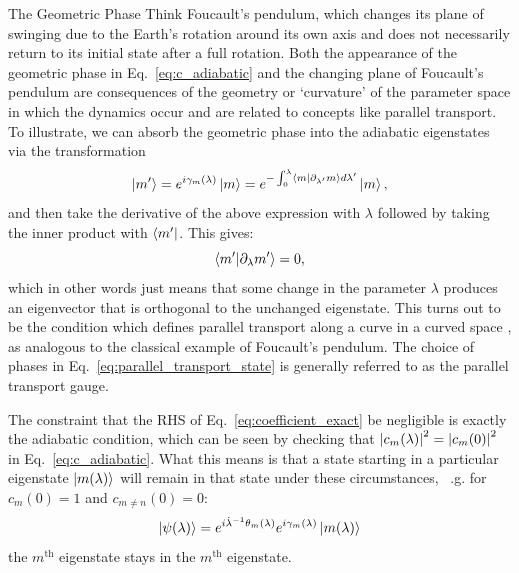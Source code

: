     \begin{mycolorbox}[geometricphase]{{The Geometric Phase}}
        Think Foucault's pendulum, which changes its plane of swinging due to the Earth's rotation around its own axis and does not necessarily return to its initial state after a full rotation. Both the appearance of the geometric phase in Eq.~\eqref{eq:c_adiabatic} and the changing plane of Foucault's pendulum are consequences of the geometry or `curvature' of the parameter space in which the dynamics occur and are related to concepts like parallel transport. To illustrate, we can absorb the geometric phase into the adiabatic eigenstates via the transformation
    \begin{equation}\label{eq:parallel_transport_state}
        \ket{m'} = e^{i \gamma_m(\lambda)}\ket{m} = e^{- \int_0^{\lambda} \braket{m}{\partial_{\lambda'} m} d \lambda'}\ket{m},
    \end{equation}
    and then take the derivative of the above expression with $\lambda$ followed by taking the inner product with $\bra{m'}$. This gives:
    \begin{equation}\label{eq:geometric_phase_cancellation}
        \braket{m'}{\partial_{\lambda} m'} = 0,
    \end{equation}
    which in other words just means that some change in the parameter $\lambda$ produces an eigenvector that is orthogonal to the unchanged eigenstate. This turns out to be the condition which defines parallel transport along a curve in a curved space \cite{nakahara_geometry_2003}, as analogous to the classical example of Foucault's pendulum. The choice of phases in Eq.~\eqref{eq:parallel_transport_state} is generally referred to as the parallel transport gauge.
    \end{mycolorbox}
    
    The constraint that the RHS of Eq.~\eqref{eq:coefficient_exact} be negligible is exactly the adiabatic condition, which can be seen by checking that $\abs{c_m(\lambda)}^2 = \abs{c_m(0)}^2$ in Eq.~\eqref{eq:c_adiabatic}. What this means is that a state starting in a particular eigenstate $\ket{m(\lambda)}$ will remain in that state under these circumstances, ~\@e.g. for $c_m(0) = 1$ and $c_{m \neq n}(0) = 0$:
    \begin{equation}\label{eq:adiabatic_states}
        \ket{\psi(\lambda)} = e^{i \dot{\lambda}^{-1} \theta_m(\lambda)}e^{i \gamma_m(\lambda)} \ket{m(\lambda)}
    \end{equation}
    the $m^{\text{th}}$ eigenstate stays in the $m^{\text{th}}$ eigenstate.
    
